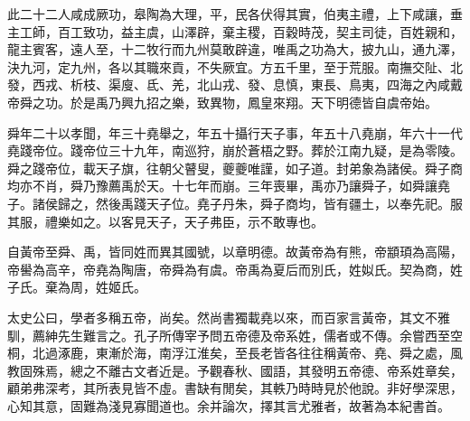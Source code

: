 此二十二人咸成厥功，皋陶為大理，平，民各伏得其實，伯夷主禮，上下咸讓，垂主工師，百工致功，益主虞，山澤辟，棄主稷，百穀時茂，契主司徒，百姓親和，龍主賓客，遠人至，十二牧行而九州莫敢辟違，唯禹之功為大，披九山，通九澤，決九河，定九州，各以其職來貢，不失厥宜。方五千里，至于荒服。南撫交阯、北發，西戎、析枝、渠廋、氐、羌，北山戎、發、息慎，東長、鳥夷，四海之內咸戴帝舜之功。於是禹乃興九招之樂，致異物，鳳皇來翔。天下明德皆自虞帝始。

舜年二十以孝聞，年三十堯舉之，年五十攝行天子事，年五十八堯崩，年六十一代堯踐帝位。踐帝位三十九年，南巡狩，崩於蒼梧之野。葬於江南九疑，是為零陵。舜之踐帝位，載天子旗，往朝父瞽叟，夔夔唯謹，如子道。封弟象為諸侯。舜子商均亦不肖，舜乃豫薦禹於天。十七年而崩。三年喪畢，禹亦乃讓舜子，如舜讓堯子。諸侯歸之，然後禹踐天子位。堯子丹朱，舜子商均，皆有疆土，以奉先祀。服其服，禮樂如之。以客見天子，天子弗臣，示不敢專也。

自黃帝至舜、禹，皆同姓而異其國號，以章明德。故黃帝為有熊，帝顓頊為高陽，帝嚳為高辛，帝堯為陶唐，帝舜為有虞。帝禹為夏后而別氏，姓姒氏。契為商，姓子氏。棄為周，姓姬氏。

太史公曰，學者多稱五帝，尚矣。然尚書獨載堯以來，而百家言黃帝，其文不雅馴，薦紳先生難言之。孔子所傳宰予問五帝德及帝系姓，儒者或不傳。余嘗西至空桐，北過涿鹿，東漸於海，南浮江淮矣，至長老皆各往往稱黃帝、堯、舜之處，風教固殊焉，總之不離古文者近是。予觀春秋、國語，其發明五帝德、帝系姓章矣，顧弟弗深考，其所表見皆不虛。書缺有閒矣，其軼乃時時見於他說。非好學深思，心知其意，固難為淺見寡聞道也。余并論次，擇其言尤雅者，故著為本紀書首。